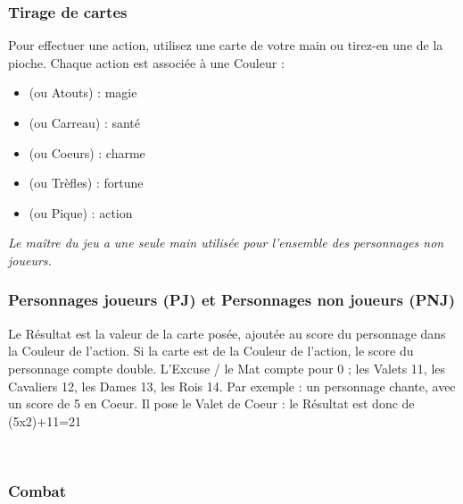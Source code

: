 \documentclass[11pt,twoside,a5paper]{book}
\begin{document}
\begin{minipage}[ht]{0.45\textwidth}

	\subsubsection{Tirage de cartes}
	
	Pour effectuer une action, utilisez une carte de votre main ou tirez-en une de la pioche.
	Chaque action est associ{\'e}e {\`a} une Couleur :
	\begin{itemize}
		\item[Arcanes] (ou Atouts) : magie
		\item[B{\^a}tons] (ou Carreau) : sant{\'e}
		\item[Coupes] (ou Coeurs) : charme
		\item[Deniers] (ou Tr{\`e}fles) : fortune
		\item[Ep{\'e}es] (ou Pique) : action
	\end{itemize}
	
	\emph{Le ma{\^i}tre du jeu a une seule main utilis{\'e}e pour l'ensemble des personnages non joueurs.}

\end{minipage} \hfill \begin{minipage}[ht]{0.50\textwidth}

	\subsubsection{Personnages joueurs (PJ) et Personnages non joueurs (PNJ)}
	
	Le R{\'e}sultat est la valeur de la carte pos{\'e}e, ajout{\'e}e au score du personnage dans la Couleur de l'action. Si la carte est de la Couleur de l'action, le score du personnage compte double.
	L'Excuse / le Mat compte pour 0 ; les Valets 11, les Cavaliers 12, les Dames 13, les Rois 14. 
	Par exemple : un personnage chante, avec un score de 5 en Coeur. Il pose le Valet de Coeur : le R{\'e}sultat est donc de (5x2)+11=21

\end{minipage}~\\

\subsubsection{Combat}
\end{document}
